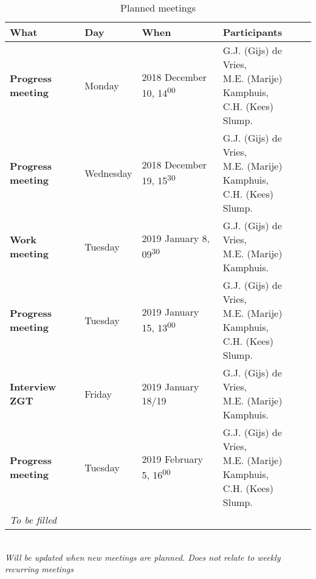 \begin{table}[h!]
	\hspace*{-1.2cm}\begin{tabular}{p{29mm}|lll}
		\textbf{What} 		& 	Day	&	When	&	Participants \hfill \\
		\hline
		\textbf{Progress meeting} & Monday 		& 2018 December 10,	14\textsuperscript{00} &	 \makecell[l]{G.J. (Gijs) de Vries, \\M.E. (Marije) Kamphuis, \\C.H. (Kees) Slump.}\\
		\rowcolor{Gray}
		 \textbf{Progress meeting} & Wednesday 	& 2018 December 19,	15\textsuperscript{30} &	 \makecell[l]{G.J. (Gijs) de Vries, \\M.E. (Marije) Kamphuis, \\C.H. (Kees) Slump.}\\
		 \textbf{Work meeting} & Tuesday & 2019 January 8, 09\textsuperscript{30} & \makecell[l]{G.J. (Gijs) de Vries, \\M.E. (Marije) Kamphuis.} \\
		 \rowcolor{Gray}
		\textbf{Progress meeting} & Tuesday & 2019 January 15, 13\textsuperscript{00}	& \makecell[l]{G.J. (Gijs) de Vries, \\ M.E. (Marije) Kamphuis, \\ C.H. (Kees) Slump.}\\	
		\textbf{Interview ZGT} \hfill & Friday & 2019 January 18/19 & \makecell[l]{G.J. (Gijs) de Vries, \\M.E. (Marije) Kamphuis.}\\ 
		 \rowcolor{Gray}
		 \textbf{Progress meeting} & Tuesday & 2019 February 5, 16\textsuperscript{00} & \makecell[l]{G.J. (Gijs) de Vries, \\ M.E. (Marije) Kamphuis, \\ C.H. (Kees) Slump.}\\	
		  \textit{To be filled} & & & \\
		 \hline
	\end{tabular}\hspace*{-1.2cm} \\
	\textit{Will be updated when new meetings are planned. Does not relate to weekly recurring meetings}
	\caption{Planned meetings}
	\label{tab:planned_meet}
\end{table}